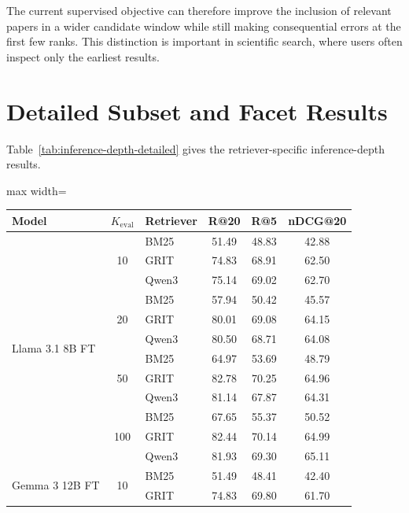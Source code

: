 \documentclass[pdflatex,sn-basic,Numbered]{sn-jnl}%
\theoremstyle{thmstyleone}%
\theoremstyle{thmstyletwo}%
\theoremstyle{thmstylethree}%
\begin{document}
The current supervised objective can therefore improve the inclusion of relevant
papers in a wider candidate window while still making consequential errors at the
first few ranks. This distinction is important in scientific search, where users
often inspect only the earliest results.

\FloatBarrier
\section{Detailed Subset and Facet Results}
\label{app:detailed-results}

Table~\ref{tab:inference-depth-detailed} gives the retriever-specific inference-depth results.

\begin{table}[htbp]


\centering
\scriptsize
\setlength{\tabcolsep}{4pt}
\renewcommand{\arraystretch}{1.02}
\begin{adjustbox}{max width=\linewidth}
\begin{tabular}{l c l c c c}
\hline
Model & $K_{\mathrm{eval}}$ & Retriever & R@20 & R@5 & nDCG@20 \\
\hline
\multirow{12}{*}{Llama 3.1 8B FT}
 & \multirow{3}{*}{10}  & BM25  & 51.49 & 48.83 & 42.88 \\
 &                       & GRIT  & 74.83 & 68.91 & 62.50 \\
 &                       & Qwen3 & 75.14 & 69.02 & 62.70 \\
 & \multirow{3}{*}{20}  & BM25  & 57.94 & 50.42 & 45.57 \\
 &                       & GRIT  & 80.01 & 69.08 & 64.15 \\
 &                       & Qwen3 & 80.50 & 68.71 & 64.08 \\
 & \multirow{3}{*}{50}  & BM25  & 64.97 & 53.69 & 48.79 \\
 &                       & GRIT  & 82.78 & 70.25 & 64.96 \\
 &                       & Qwen3 & 81.14 & 67.87 & 64.31 \\
 & \multirow{3}{*}{100} & BM25  & 67.65 & 55.37 & 50.52 \\
 &                       & GRIT  & 82.44 & 70.14 & 64.99 \\
 &                       & Qwen3 & 81.93 & 69.30 & 65.11 \\
\hline
\multirow{12}{*}{Gemma 3 12B FT}
 & \multirow{3}{*}{10}  & BM25  & 51.49 & 48.41 & 42.40 \\
 &                       & GRIT  & 74.83 & 69.80 & 61.70 \\

\end{tabular}
\end{adjustbox}
\end{table}
\end{document}
